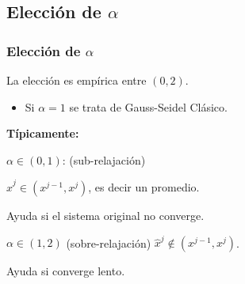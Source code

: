 \documentclass[xcolor=svgnames]{beamer} %
\theoremstyle{plain}
\renewcommand{\textbf}[1]{{\bfseries\textcolor{redUnq2}{#1}}}
\theoremstyle{definition}
\begin{document}
\subsection{Elección de $\alpha$}

\begin{frame}
\frametitle{Elección de $\alpha$}
La elección es empírica entre $(0,2)$.


\begin{itemize}
\pause
\item Si $\alpha=1$ se trata de Gauss-Seidel Clásico.
\end{itemize}

\textbf{Típicamente:}

\begin{minipage}{.45\linewidth}
\pause
$\alpha \in (0,1)$: (sub-relajación) 

$\hat x^j \in (x^{j-1},x^j)$, es decir un promedio.
\pause 

Ayuda si el sistema original no converge.
\end{minipage}  \vrule  \begin{minipage}{.45\linewidth}
\pause
$\alpha \in (1,2)$ (sobre-relajación) 
$\hat x^j \notin (x^{j-1},x^j)$.\vspace{10pt}
\pause 

Ayuda si converge lento.
\end{minipage}



\end{frame}
\end{document}
